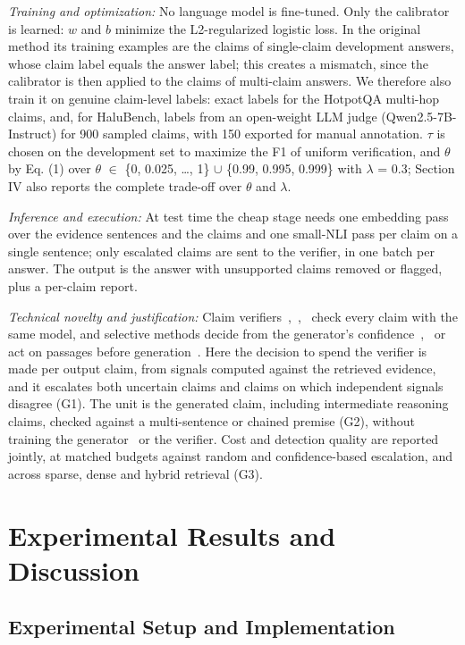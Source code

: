 \documentclass[conference]{IEEEtran}
\begin{document}
\textit{Training and optimization:} No language model is fine-tuned. Only the calibrator is learned: $w$ and $b$ minimize the L2-regularized logistic loss. In the original method its training examples are the claims of single-claim development answers, whose claim label equals the answer label; this creates a mismatch, since the calibrator is then applied to the claims of multi-claim answers. We therefore also train it on genuine claim-level labels: exact labels for the HotpotQA multi-hop claims, and, for HaluBench, labels from an open-weight LLM judge (Qwen2.5-7B-Instruct) for 900 sampled claims, with 150 exported for manual annotation. $\tau$ is chosen on the development set to maximize the F1 of uniform verification, and $\theta$ by Eq. (1) over $\theta$ $\in$ \{0, 0.025, \ldots{}, 1\} $\cup$ \{0.99, 0.995, 0.999\} with $\lambda$ = 0.3; Section IV also reports the complete trade-off over $\theta$ and $\lambda$.

\textit{Inference and execution:} At test time the cheap stage needs one embedding pass over the evidence sentences and the claims and one small-NLI pass per claim on a single sentence; only escalated claims are sent to the verifier, in one batch per answer. The output is the answer with unsupported claims removed or flagged, plus a per-claim report.

\textit{Technical novelty and justification:} Claim verifiers~\cite{min_factscore},~\cite{zha_alignscore},~\cite{tang_minicheck} check every claim with the same model, and selective methods decide from the generator's confidence~\cite{jiang_flare},~\cite{manakul_selfcheck} or act on passages before generation~\cite{kirubavathi_sr}. Here the decision to spend the verifier is made per output claim, from signals computed against the retrieved evidence, and it escalates both uncertain claims and claims on which independent signals disagree (G1). The unit is the generated claim, including intermediate reasoning claims, checked against a multi-sentence or chained premise (G2), without training the generator~\cite{sun_rearter} or the verifier. Cost and detection quality are reported jointly, at matched budgets against random and confidence-based escalation, and across sparse, dense and hybrid retrieval (G3).

\section{Experimental Results and Discussion}

\subsection{Experimental Setup and Implementation}
\end{document}
